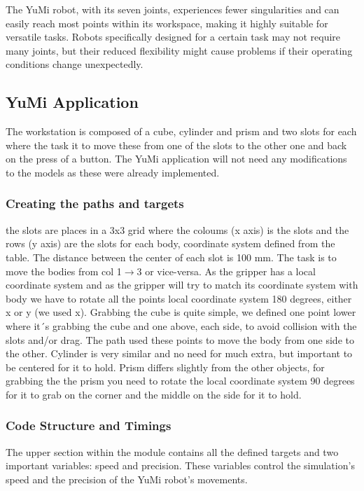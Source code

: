 \documentclass[a4paper,12pt]{article}
\begin{document}
The YuMi robot, with its seven joints, experiences fewer singularities and can easily reach most points within its workspace, making it highly suitable for versatile tasks. Robots specifically designed for a certain task may not require many joints, but their reduced flexibility might cause problems if their operating conditions change unexpectedly.



\subsection{YuMi Application}
The workstation is composed of a cube, cylinder and prism and two slots for each where the task it to move these from one of the slots to the other one and back on the press of a button.
The YuMi application will not need any modifications to the models as these were already implemented.
\subsubsection{Creating the paths and targets}
the slots are places in a 3x3 grid where the coloums (x axis) is the slots and the rows (y axis) are the slots for each body, coordinate system defined from the table. The distance between the center of each slot is 100 mm. The task is to move the bodies from col 1$\rightarrow$3 or vice-versa. 
As the gripper has a local coordinate system and as the gripper will try to match its coordinate system with body we have to rotate all the points local coordinate system 180 degrees, either x or y (we used x).
Grabbing the cube is quite simple, we defined one point lower where it´s grabbing the cube and one above, each side, to avoid collision with the slots and/or drag. The path used these points to move the body from one side to the other.
Cylinder is very similar and no need for much extra, but important to be centered for it to hold.
Prism differs slightly from the other objects, for grabbing the the prism you need to rotate the local coordinate system 90 degrees for it to grab on the corner and the middle on the side for it to hold.  

\subsubsection{Code Structure and Timings}
The upper section within the module contains all the defined targets and two important variables: speed and precision. These variables control the simulation's speed and the precision of the YuMi robot's movements.
\end{document}
